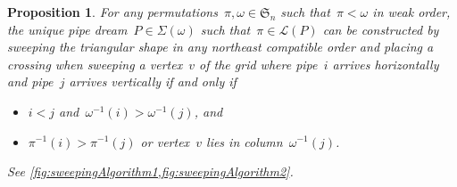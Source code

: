 \documentclass[reqno]{amsart}
\newtheorem{proposition}[theorem]{Proposition}
\theoremstyle{definition}
\newcommand{\fS}{\mathfrak{S}} %
\newcommand{\acyclicPipeDreams}{\Sigma} %
\newcommand{\linearExtensions}{\mathcal{L}} %
\begin{document}
\begin{proposition}
\label{prop:sweepingAlgorithm}
For any permutations~$\pi,\omega \in \fS_n$ such that~$\pi < \omega$ in weak order, the unique pipe dream~$P \in \acyclicPipeDreams(\omega)$ such that~$\pi \in \linearExtensions(P)$ can be constructed by sweeping the triangular shape in any northeast compatible order and placing a crossing when sweeping a vertex~$v$ of the grid where pipe~$i$ arrives horizontally and pipe~$j$ arrives vertically if and only if
\begin{itemize}
\item $i < j$ and~$\omega^{-1}(i) > \omega^{-1}(j)$, and 
\item $\pi^{-1}(i) > \pi^{-1}(j)$ or vertex~$v$ lies in column~$\omega^{-1}(j)$.
\end{itemize}
See \cref{fig:sweepingAlgorithm1,fig:sweepingAlgorithm2}.
\end{proposition}
\end{document}
